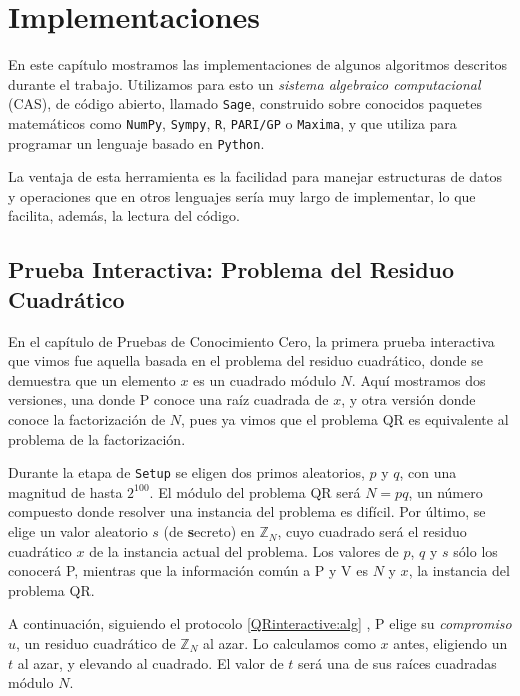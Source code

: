 \chapter{Implementaciones}\label{ch:implementaciones} 

En este capítulo mostramos las implementaciones de algunos algoritmos descritos durante el trabajo. Utilizamos para esto un \textit{sistema algebraico computacional} (CAS), de código abierto, llamado \texttt{Sage}, construido sobre conocidos paquetes matemáticos como \texttt{NumPy}, \texttt{Sympy}, \texttt{R}, \texttt{PARI/GP} o \texttt{Maxima}, y que utiliza para programar un lenguaje basado en \texttt{Python}.

La ventaja de esta herramienta es la facilidad para manejar estructuras de datos y operaciones que en otros lenguajes sería muy largo de implementar, lo que facilita, además, la lectura del código.


\section{Prueba Interactiva: Problema del Residuo Cuadrático}


En el capítulo de Pruebas de Conocimiento Cero, la primera prueba interactiva que vimos fue aquella basada en el problema del residuo cuadrático, donde se demuestra que un elemento $x$ es un cuadrado módulo $N$. Aquí mostramos dos versiones, una donde P conoce una raíz cuadrada de $x$, y otra versión donde conoce la factorización de $N$, pues ya vimos que el problema QR es equivalente al problema de la factorización.






Durante la etapa de \texttt{Setup} se eligen dos primos aleatorios, $p$ y $q$, con una magnitud de hasta $2^{100}$. El módulo del problema QR será $N=pq$, un número compuesto donde resolver una instancia del problema es difícil. Por último, se elige un valor aleatorio $s$ (de \textbf{s}ecreto) en $\mathbb{Z}_N$, cuyo cuadrado será el residuo cuadrático $x$ de la instancia actual del problema. Los valores de $p$, $q$ y $s$ sólo los conocerá P, mientras que la información común a P y V es $N$ y $x$, la instancia del problema QR.

A continuación, siguiendo el protocolo \ref{QRinteractive:alg} , P elige su \textit{compromiso} $u$, un residuo cuadrático de $\mathbb{Z}_N$ al azar. Lo calculamos como $x$ antes, eligiendo un $t$ al azar, y elevando al cuadrado. El valor de $t$ será una de sus raíces cuadradas módulo $N$.

